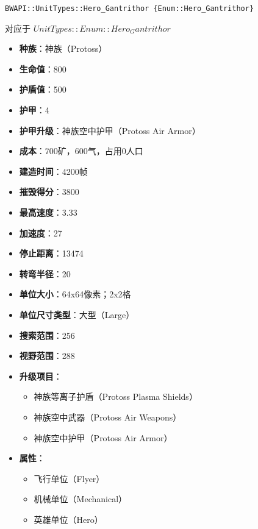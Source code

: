 \begin{tcolorbox}[colback=white, colframe=black!60!white, title=Hero\_Gantrithor(), arc=0mm]
    \begin{verbatim}
BWAPI::UnitTypes::Hero_Gantrithor {Enum::Hero_Gantrithor}
    \end{verbatim}
    对应于  $ UnitTypes::Enum::Hero_Gantrithor $ 
    \begin{itemize}
        \item \textbf{种族}：神族（Protoss）
        \item \textbf{生命值}：800
        \item \textbf{护盾值}：500
        \item \textbf{护甲}：4
        \item \textbf{护甲升级}：神族空中护甲（Protoss Air Armor）
        \item \textbf{成本}：700矿，600气，占用0人口
        \item \textbf{建造时间}：4200帧
        \item \textbf{摧毁得分}：3800
        \item \textbf{最高速度}：3.33
        \item \textbf{加速度}：27
        \item \textbf{停止距离}：13474
        \item \textbf{转弯半径}：20
        \item \textbf{单位大小}：64x64像素；2x2格
        \item \textbf{单位尺寸类型}：大型（Large）
        \item \textbf{搜索范围}：256
        \item \textbf{视野范围}：288
        \item \textbf{升级项目}：
            \begin{itemize}
                \item 神族等离子护盾（Protoss Plasma Shields）
                \item 神族空中武器（Protoss Air Weapons）
                \item 神族空中护甲（Protoss Air Armor）
            \end{itemize}
        \item \textbf{属性}：
            \begin{itemize}
                \item 飞行单位（Flyer）
                \item 机械单位（Mechanical）
                \item 英雄单位（Hero）
            \end{itemize}
    \end{itemize}
\end{tcolorbox}

